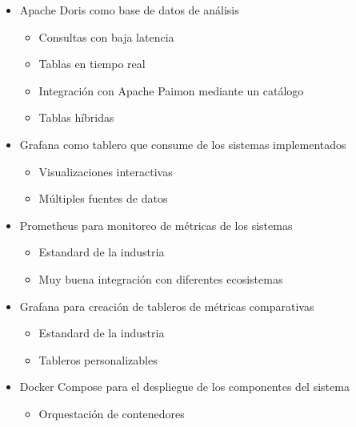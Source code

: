 \begin{itemize}
\begin{itemize}
       \end{itemize}
    \item Apache Doris como base de datos de análisis
       \begin{itemize}
           \item Consultas con baja latencia
           \item Tablas en tiempo real
           \item Integración con Apache Paimon mediante un catálogo
           \item Tablas híbridas
       \end{itemize}
    \item Grafana como tablero que consume de los sistemas implementados
       \begin{itemize}
           \item Visualizaciones interactivas
           \item Múltiples fuentes de datos
       \end{itemize}
    \item Prometheus para monitoreo de métricas de los sistemas
       \begin{itemize}
           \item Estandard de la industria
           \item Muy buena integración con diferentes ecosistemas
       \end{itemize}
    \item Grafana para creación de tableros de métricas comparativas
       \begin{itemize}
            \item Estandard de la industria
            \item Tableros personalizables
       \end{itemize}
    \item Docker Compose para el despliegue de los componentes del sistema
       \begin{itemize}
           \item Orquestación de contenedores
       \end{itemize}
   \end{itemize}
\newpage